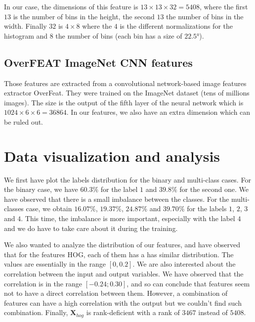 \documentclass{article} %
\begin{document}
In our case, the dimensions of this feature is $13 \times 13 \times 32=5408$, where the first $13$ is the number of bins in the height, the second $13$ the number of bins in the width. Finally $32$ is $4 \times 8$ where the $4$ is the different normalizations for the histogram and $8$ the number of bins (each bin has a size of $22.5°$). 

\subsection{OverFEAT ImageNet CNN features}

Those features are extracted from a convolutional network-based image features extractor OverFeat. They were trained on the ImageNet dataset (tens of millions images). The size is the output of the fifth layer of the neural network which is $1024 \times 6 \times 6 = 36864$. In our features, we also have an extra dimension which can be ruled out.

\section{Data visualization and analysis}

We first have plot the labels distribution for the binary and multi-class cases. For the binary case, we have $60.3\%$ for the label $1$ and $39.8\%$ for the second one. We have observed that there is a small imbalance between the classes. For the multi-classes case, we obtain $16.07\%$, $19.37\%$, $24.87\%$ and $39.70\%$ for the labels $1$, $2$, $3$ and $4$. This time, the imbalance is more important, especially with the label $4$ and we do have to take care about it during the training.

We also wanted to analyze the distribution of our features, and have observed that for the features HOG, each of them has a has similar distribution. The values are essentially in the range $[0, 0.2]$. We are also interested about the correlation between the input and output variables. We have observed that the correlation is in the range $[-0.24 ;0.30]$, and so can conclude that features seem not to have a direct correlation between them. However, a combination of features can have a high correlation with the output but we couldn't find such combination. Finally, $\mathbf{X}_{hog}$ is rank-deficient with a rank of $3467$ instead of $5408$.
\end{document}
